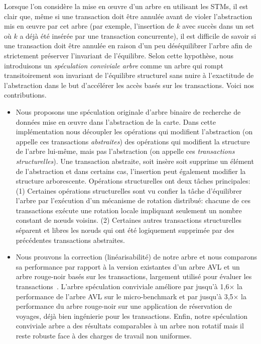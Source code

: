 Lorsque l'on considère la mise en œuvre d'un arbre en utilisant les STMs, il est clair que, même si une transaction doit être annulée avant de violer
l'abstraction mis en œuvre par cet arbre (par exemple, l'insertion de $k$ avec succès dans un set où $k$ a déjà été insérée par une transaction concurrente),
il est difficile de savoir si une transaction doit être annulée en raison d'un peu déséquilibrer l'arbre afin de strictement préserver l'invariant de l'équilibre.
Selon cette hypothèse, nous introduisons un \emph{spéculation conviviale arbre} comme un arbre qui rompt transitoirement son invariant de l'équilibre structurel
sans nuire à l'exactitude de l'abstraction dans le but d'accélérer les accès basés sur les transactions.
Voici nos contributions.


\begin{itemize}

\item Nous proposons une spéculation originale d'arbre binaire de recherche de données mise en œuvre dans l'abstraction de la carte.
Dans cette implémentation nous découpler les opérations qui modifient l'abstraction
(on appelle ces transactions \emph{abstraites}) des opérations qui modifient la structure de l'arbre lui-même, mais pas l'abstraction (on appelle ces \emph{transactions structurelles}).
Une transaction abstraite, soit insère soit supprime un élément de l'abstraction et dans certains cas, l'insertion peut également modifier la structure arborescente.
Opérations structurelles ont deux tâches principales:
(1) Certaines opérations structurelles sont vu confier la tâche d'équilibrer l'arbre par l'exécution d'un mécanisme de rotation distribué:
chacune de ces transactions exécute une rotation locale impliquant seulement un nombre constant de nœuds voisins.
(2) Certaines autres transactions structurelles séparent et libres les nœuds qui ont été logiquement supprimée par des précédentes transactions abstraites.



\item Nous prouvons la correction (linéarisabilité) de notre arbre et nous comparons sa performance par rapport à la version existantes d'un arbre AVL
et un arbre rouge-noir basés sur les transactions, largement utilisé pour évaluer les transactions~\cite{DSS06, HLMS03, CCKO08, HK08, FFR08, DFGG11}.
L'arbre spéculation conviviale améliore par jusqu'à 1,6$\times$ la performance de l'arbre AVL sur le micro-benchmark et par jusqu'à 3,5$\times$ la performance du arbre rouge-noir sur
une application de réservation de voyages, déjà bien ingénierie pour les transactions.
Enfin, notre spéculation conviviale arbre a des résultats comparables à un arbre non rotatif mais il reste robuste face à des charges de travail non uniformes.




\end{itemize}
